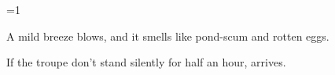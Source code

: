 \ifnum\value{cycle}=1
\begin{boxtext}
  A mild breeze blows, and it smells like pond-scum and rotten eggs.
\end{boxtext}

If the troupe don't stand silently for half an hour,  arrives.

\basilisk

\fi
